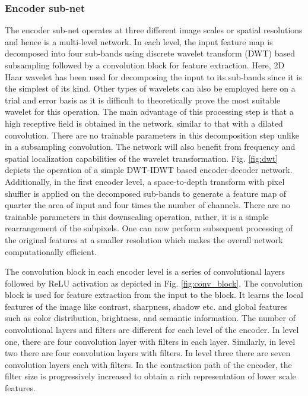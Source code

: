 \documentclass[runningheads]{llncs}
\begin{document}
\subsubsection{Encoder sub-net}
\par The encoder sub-net operates at three different image scales or spatial resolutions and hence is a multi-level network. In each level, the input feature map is decomposed into four sub-bands using discrete wavelet transform (DWT) based subsampling followed by a convolution block for feature extraction. Here, 2D Haar wavelet has been used for decomposing the input to its sub-bands since it is the simplest of its kind. Other types of wavelets can also be employed here on a trial and error basis as it is difficult to theoretically prove the most suitable wavelet for this operation.  The main advantage of this processing step is that a high receptive field is obtained in the network, similar to that with a dilated convolution. There are no trainable parameters in this decomposition step unlike in a subsampling convolution. The network will also benefit from frequency and spatial localization capabilities of the wavelet transformation. Fig. \ref{fig:dwt} depicts the operation of a simple DWT-IDWT based encoder-decoder network. Additionally, in the first encoder level, a space-to-depth transform with pixel shuffler is applied on the decomposed sub-bands to generate a feature map of quarter the area of input and four times the number of channels. There are no trainable parameters in this downscaling operation, rather, it is a simple rearrangement of the subpixels. One can now perform subsequent processing of the original features at a smaller resolution which makes the overall network computationally  efficient.

\par The convolution block in each encoder level is a series of convolutional layers followed by ReLU activation as depicted in Fig. \ref{fig:conv_block}. The convolution block is used for feature extraction from the input to the block. It learns the local features of the image like contrast, sharpness, shadow etc. and global features such as color distribution, brightness, and semantic information. The number of convolutional layers and filters are different for each level of the encoder. In level one, there are four convolution layer with  filters in each layer. Similarly, in level two there are four convolution layers with  filters. In level three there are seven convolution layers each with  filters. In the contraction path of the encoder, the filter size is progressively increased to obtain a rich representation of lower scale features.
\end{document}
